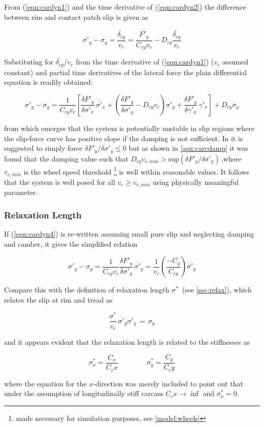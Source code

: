 \documentclass[12pt,a4paper]{report}
\newcommand{\eq}[2]{
\begin{equation} \label{#1}
#2
\end{equation}
}
\newcommand{\req}[1]{
(\ref{#1})
}
\newcommand{\dif}[2]{
\frac{\delta#1}{\delta#2} 
}
\newcommand{\difp}[2]{
\frac{\delta#1}{\delta#2} \, \dot{#2} 
}
\begin{document}
From \req{eqn:cardyn1} and the time derivative of \req{eqn:cardyn2} the difference between rim and contact patch slip is given as

\eq{cardyn3}{\sigma'_y - \sigma_y = \frac{\dot{\delta_{cy}}}{v_c} = \frac{\dot{F'_y}}{C_{cy}v_c} - D_{cy}\frac{\ddot{\delta_{cy}}}{v_c}}

Substituting for $\ddot{\delta_{cy}} / v_c $ from the time derivative of \req{eqn:cardyn1} ($v_c$ assumed constant) and partial time derivatives of the lateral force the plain differential equation is readily obtained:

\eq{eqn:cardyn4}{\sigma'_y - \sigma_y =
	\frac{1}{C_{cy}v_c} \left[\difp{F'_y}{\sigma'_x} + \left(\dif{F'_y}{\sigma'_y}-D_{cy}v_c\right)\dot{\sigma'_y} + \difp{F'_y}{\gamma'_x}\right] 
	+ D_{cy}\dot{\sigma_y}}

from which emerges that the system is potentially unstable in slip regions where the slip-force curve has positive slope if the damping is not sufficient. In \citep{pacejka02} it is suggested to simply force $\delta F'_y / \delta \sigma'_y \leqslant 0$ but as shown in \ref{apx:carcdamp} it was found that the damping value such that $D_{cy}v_{c,min} > \mathrm{sup}(\delta F'_y / \delta \sigma'_y)\,$,where $v_{c,min}$ is the wheel speed threshold \footnote{made necessary for simulation purposes, see \ref{model:wheels}} is well within reasonable values.
It follows that the system is well posed for all $v_c \geqslant v_{c,min}$ using physically meaningful parameter. %

\subsubsection*{Relaxation Length} \label{introrelax}
If \req{eqn:cardyn4} is re-written assuming small pure slip and neglecting damping and camber, it gives the simplified relation
\eq{eqn:cardyn4simp}{\sigma'_y - \sigma_y = \frac{1}{C_{cy} v_c} \difp{F'_y}{\sigma'_y} = 
											\frac{1}{v_c} \left(\frac{-C_y}{C_{cy}}\right) \dot{\sigma'_y}}

Compare this with the definition of relaxation length $\sigma^* \,$ (see \ref{sec:relax}), which relates the slip at rim and tread as
\eq{eqn:cardyn5}{\frac{\sigma^*}{v_c} \, \dot{\sigma'_y} \sigma'_y \, = \, \sigma_y }
and it appears evident that the relaxation length is related to the stiffnesses as
\eq{eqn:cardyn6}{\sigma^*_x = \frac{C_x}{C_cx} \qquad \qquad \sigma^*_y = \frac{C_y}{C_cy}}
where the equation for the $x$-direction was merely included to point out that under the assumption of longitudinally stiff carcass $C_cx \rightarrow \inf$ and $\sigma^*_x = 0$.
\end{document}
